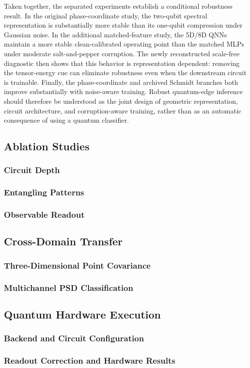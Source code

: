 \documentclass[11pt]{article}
\begin{document}
Taken together, the separated experiments establish a conditional robustness
result.  In the original phase-coordinate study, the two-qubit spectral
representation is substantially more stable than its one-qubit compression
under Gaussian noise.  In the additional matched-feature study, the 5D/8D
QNNs maintain a more stable clean-calibrated operating point than the matched
MLPs under moderate salt-and-pepper corruption.  The newly
reconstructed scale-free diagnostic then shows that this behavior is
representation dependent: removing the tensor-energy cue can eliminate
robustness even when the downstream circuit is trainable.  Finally, the
phase-coordinate and archived Schmidt branches both improve substantially with
noise-aware training.  Robust quantum-edge inference should therefore be
understood as the joint design of geometric representation, circuit
architecture, and corruption-aware training, rather than as an automatic
consequence of using a quantum classifier.

\subsection{Ablation Studies}

\subsubsection{Circuit Depth}

\subsubsection{Entangling Patterns}

\subsubsection{Observable Readout}

\subsection{Cross-Domain Transfer}

\subsubsection{Three-Dimensional Point Covariance}

\subsubsection{Multichannel PSD Classification}

\subsection{Quantum Hardware Execution}

\subsubsection{Backend and Circuit Configuration}

\subsubsection{Readout Correction and Hardware Results}
\end{document}
